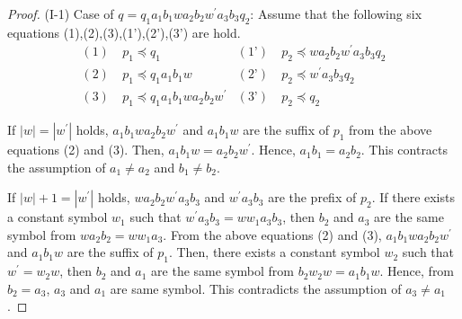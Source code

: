 \begin{proof}
\noindent
(I-1) Case of $q=q_{1}a_{1}b_{1}wa_{2}b_{2}w^{\prime}a_{3}b_{3}q_{2}$:
Assume that the following six equations (1),(2),(3),(1'),(2'),(3') are hold.
\begin{align*}
(1)~& p_{1} \preceq q_{1} & (\text{1'})~& p_{2} \preceq wa_{2}b_{2}w^{\prime}a_{3}b_{3}q_{2} \\
(2)~& p_{1} \preceq q_{1}a_{1}b_{1}w & (\text{2'})~& p_{2} \preceq w^{\prime}a_{3}b_{3}q_{2} \\
(3)~& p_{1} \preceq q_{1}a_{1}b_{1}wa_{2}b_{2}w^{\prime} & (\text{3'})~& p_{2} \preceq q_{2}
\end{align*}

If $|w|=|w^{\prime}|$ holds, $a_{1}b_{1}wa_{2}b_{2}w^{\prime}$ and $a_{1}b_{1}w$ are the suffix of $p_{1}$ from the above equations (2) and (3).
Then, $a_{1}b_{1}w=a_{2}b_{2}w^{\prime}$.
Hence, $a_{1}b_{1}=a_{2}b_{2}$.
This contracts the assumption of $a_{1} \ne a_{2}$ and $b_{1} \ne b_{2}$.

If $|w|+1=|w^{\prime}|$ holds, $wa_{2}b_{2}w^{\prime}a_{3}b_{3}$ and $w^{\prime}a_{3}b_{3}$ are the prefix of $p_{2}$.
If there exists a constant symbol $w_{1}$ such that $w^{\prime}a_{3}b_{3}=ww_{1}a_{3}b_{3}$,
then $b_{2}$ and $a_{3}$ are the same symbol from $wa_{2}b_{2}=ww_{1}a_{3}$.
From the above equations (2) and (3), $a_{1}b_{1}wa_{2}b_{2}w^{\prime}$ and $a_{1}b_{1}w$ are the suffix of $p_{1}$.
Then, there exists a constant symbol $w_{2}$ such that $w^{\prime}=w_{2}w$,
then $b_{2}$ and $a_{1}$ are the same symbol from $b_{2}w_{2}w=a_{1}b_{1}w$.
Hence, from $b_{2}=a_{3}$, $a_{3}$ and $a_{1}$ are same symbol.
This contradicts the assumption of $a_{3} \ne a_{1}$.


\end{proof}
